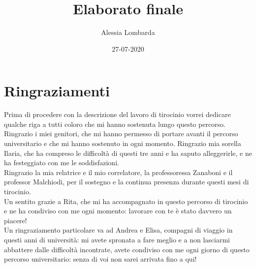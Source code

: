 \documentclass[oneside, openany]{book}
\title{Elaborato finale}
\date{27-07-2020}
\author{Alessia Lombarda}
\begin{document}
	\begin{titlepage}
		
	\end{titlepage}
	\frontmatter
	\chapter*{Ringraziamenti}
	Prima di procedere con la descrizione del lavoro di tirocinio vorrei dedicare qualche riga a tutti coloro che mi hanno sostenuta lungo questo percorso.\\
	Ringrazio i miei genitori, che mi hanno permesso di portare avanti il percorso universitario e che mi hanno sostenuto in ogni momento. Ringrazio mia sorella Ilaria, che ha compreso le difficoltà di questi tre anni e ha saputo alleggerirle, e ne ha festeggiato con me le soddisfazioni.\\
	Ringrazio la mia relatrice e il mio correlatore, la professoressa Zanaboni e il professor Malchiodi, per il sostegno e la continua presenza durante questi mesi di tirocinio.\\
	Un sentito grazie a Rita, che mi ha accompagnato in questo percorso di tirocinio e ne ha condiviso con me ogni momento: lavorare con te è stato davvero un piacere!\\
	Un ringraziamento particolare va ad Andrea e Elisa, compagni di viaggio in questi anni di università: mi avete spronata a fare meglio e a non lasciarmi abbattere dalle difficoltà incontrate, avete condiviso con me ogni giorno di questo percorso universitario: senza di voi non sarei arrivata fino a qui!
	\tableofcontents
	\mainmatter
\end{document}
